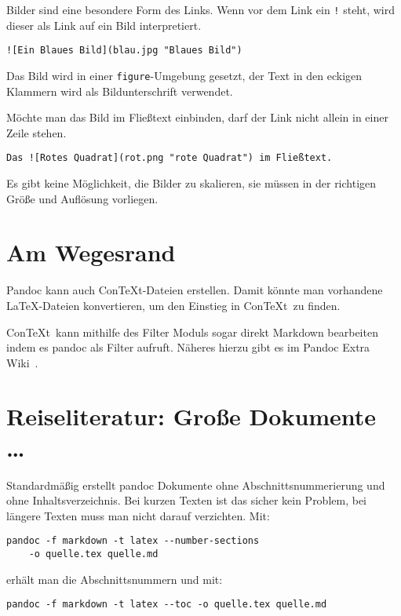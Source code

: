 \documentclass[11pt,ngerman,a4paper]{article}
\begin{document}
Bilder sind eine besondere Form des Links. Wenn vor dem Link ein
\texttt{!} steht, wird dieser als Link auf ein Bild interpretiert.

\begin{verbatim}
![Ein Blaues Bild](blau.jpg "Blaues Bild")
\end{verbatim}

Das Bild wird in einer \texttt{figure}-Umgebung gesetzt, der Text in den
eckigen Klammern wird als Bildunterschrift verwendet.

Möchte man das Bild im Fließtext einbinden, darf der Link nicht allein
in einer Zeile stehen.

\begin{verbatim}
Das ![Rotes Quadrat](rot.png "rote Quadrat") im Fließtext.
\end{verbatim}

Es gibt keine Möglichkeit, die Bilder zu skalieren, sie müssen in der
richtigen Größe und Auflösung vorliegen.

\section{Am Wegesrand}

Pandoc kann auch ConTeXt-Dateien erstellen. Damit könnte man vorhandene
LaTeX-Dateien konvertieren, um den Einstieg in ConTeXt~zu finden.

ConTeXt~kann mithilfe des Filter Moduls sogar direkt Markdown bearbeiten
indem es pandoc als Filter aufruft. Näheres hierzu gibt es im Pandoc
Extra Wiki~\autocite{pandoc-extra}.

\section{Reiseliteratur: Große Dokumente \ldots{}}

Standardmäßig erstellt pandoc Dokumente ohne Abschnittsnummerierung und
ohne Inhaltsverzeichnis. Bei kurzen Texten ist das sicher kein Problem,
bei längere Texten muss man nicht darauf verzichten. Mit:

\begin{verbatim}
pandoc -f markdown -t latex --number-sections 
    -o quelle.tex quelle.md
\end{verbatim}

erhält man die Abschnittsnummern und mit:

\begin{verbatim}
pandoc -f markdown -t latex --toc -o quelle.tex quelle.md
\end{verbatim}
\end{document}
